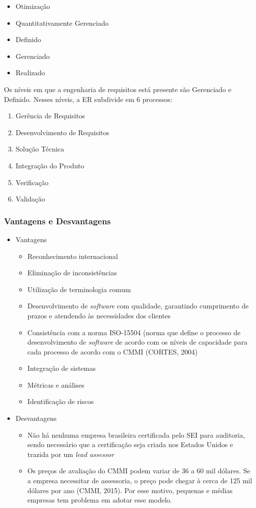 \begin{itemize}
\item Otimização
\item Quantitativamente Gerenciado
\item Definido
\item Gerenciado
\item Realizado
\end{itemize}

Os níveis em que a engenharia de requisitos está presente são Gerenciado e Definido. Nesses níveis, a ER subdivide em 6 processos:

\begin{enumerate}
\item Gerência de Requisitos
\item Desenvolvimento de Requisitos
\item Solução Técnica
\item Integração do Produto
\item Verificação
\item Validação
\end{enumerate}

\subsubsection{Vantagens e Desvantagens}

\begin{itemize}
	\item Vantagens
		\begin{itemize}
			\item Reconhecimento internacional
			\item Eliminação de inconsistências
			\item Utilização de terminologia comum
			\item Desenvolvimento de \textit{software} com qualidade, garantindo cumprimento de prazos e atendendo às necessidades dos clientes 
			\item Consistência com a norma ISO-15504 (norma que define o processo de desenvolvimento de \textit{software} de acordo com os níveis de capacidade para cada processo de acordo com o CMMI (CORTES, 2004)
			\item Integração de sistemas
			\item Métricas e análises
			\item Identificação de riscos
		\end{itemize}
	\item Desvantagens
		\begin{itemize}
			\item Não há nenhuma empresa brasileira certificada pelo SEI para auditoria, sendo necessário que a certificação seja criada nos Estados Unidos e trazida por um \textit{lead assessor}
			\item Os preços de avaliação do CMMI podem variar de 36 a 60 mil dólares. Se a empresa necessitar de assessoria, o preço pode chegar à cerca de 125 mil dólares por ano (CMMI, 2015). Por esse motivo, pequenas e médias empresas tem problema em adotar esse modelo.
		\end{itemize}
\end{itemize}

